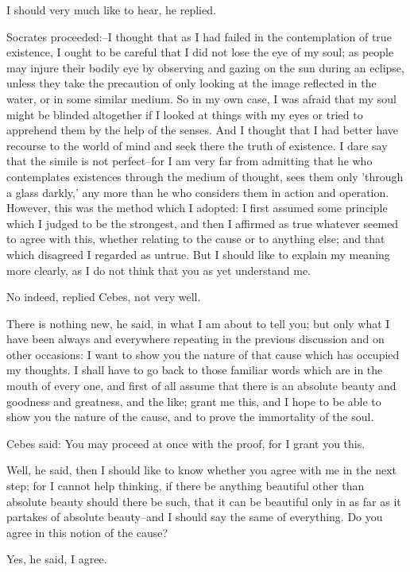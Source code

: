 I should very much like to hear, he replied.

Socrates proceeded:--I thought that as I had failed in the contemplation
of true existence, I ought to be careful that I did not lose the eye of
my soul; as people may injure their bodily eye by observing and gazing
on the sun during an eclipse, unless they take the precaution of only
looking at the image reflected in the water, or in some similar medium.
So in my own case, I was afraid that my soul might be blinded altogether
if I looked at things with my eyes or tried to apprehend them by the
help of the senses. And I thought that I had better have recourse to the
world of mind and seek there the truth of existence. I dare say that
the simile is not perfect--for I am very far from admitting that he who
contemplates existences through the medium of thought, sees them only
'through a glass darkly,' any more than he who considers them in action
and operation. However, this was the method which I adopted: I first
assumed some principle which I judged to be the strongest, and then I
affirmed as true whatever seemed to agree with this, whether relating
to the cause or to anything else; and that which disagreed I regarded
as untrue. But I should like to explain my meaning more clearly, as I do
not think that you as yet understand me.

No indeed, replied Cebes, not very well.

There is nothing new, he said, in what I am about to tell you; but
only what I have been always and everywhere repeating in the previous
discussion and on other occasions: I want to show you the nature of that
cause which has occupied my thoughts. I shall have to go back to those
familiar words which are in the mouth of every one, and first of all
assume that there is an absolute beauty and goodness and greatness, and
the like; grant me this, and I hope to be able to show you the nature of
the cause, and to prove the immortality of the soul.

Cebes said: You may proceed at once with the proof, for I grant you
this.

Well, he said, then I should like to know whether you agree with me
in the next step; for I cannot help thinking, if there be anything
beautiful other than absolute beauty should there be such, that it can
be beautiful only in as far as it partakes of absolute beauty--and I
should say the same of everything. Do you agree in this notion of the
cause?

Yes, he said, I agree.

